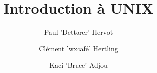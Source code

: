\usepackage{graphicx}
\title{Introduction à UNIX}
\author{Paul 'Dettorer' Hervot \newline \and Clément 'wxcafé' Hertling \newline \and Kaci
'Bruce' Adjou}
